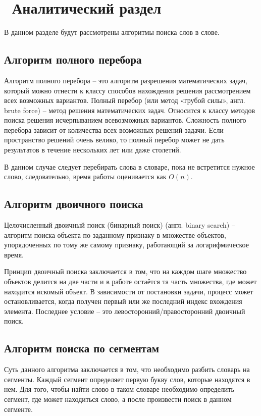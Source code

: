\chapter{ Аналитический раздел}
\label{cha:analytical}
    В данном разделе будут рассмотрены 
    алгоритмы поиска слов в слове.

    \section{Алгоритм полного перебора}
        Алгоритм полного перебора -- это алгоритм разрешения математических задач,
        который можно отнести к классу способов нахождения решения рассмотрением
        всех возможных вариантов. 
        Полный перебор (или метод «грубой силы», англ. brute force) -- метод решения математических задач.
        Относится к классу методов поиска решения исчерпыванием всевозможных вариантов.
        Сложность полного перебора зависит от количества всех возможных решений задачи.
        Если пространство решений очень велико, то полный перебор может не дать результатов 
        в течение нескольких лет или даже столетий.
        
        В данном случае следует перебирать слова в словаре, 
        пока не встретится нужное слово, 
        следовательно, время работы оценивается как $ O(n)$.

    \section{Алгоритм двоичного поиска}
        Целочисленный двоичный поиск (бинарный поиск) (англ. binary search) -- алгоритм поиска
        объекта по заданному признаку в множестве объектов, упорядоченных по тому же самому признаку,
        работающий за логарифмическое время. 

        Принцип двоичный поиска заключается в том, 
        что на каждом шаге множество объектов делится на две части 
        и в работе остаётся та часть множества, 
        где может находится искомый объект. 
        В зависимости от постановки задачи,
        процесс может остановливается, 
        когда получен первый или же последний индекс вхождения элемента.
        Последнее условие -- это левосторонний/правосторонний двоичный поиск. 

    \section{Алгоритм поиска по сегментам}
        Суть данного алгоритма заключается в том,
        что необходимо разбить словарь на сегменты.
        Каждый сегмент определяет первую букву слов,
        которые находятся в нем. 
        Для того, чтобы найти слово в таком
        словаре необходимо определить сегмент, где может находиться слово,
        а после произвести поиск в данном сегменте.

\newpage